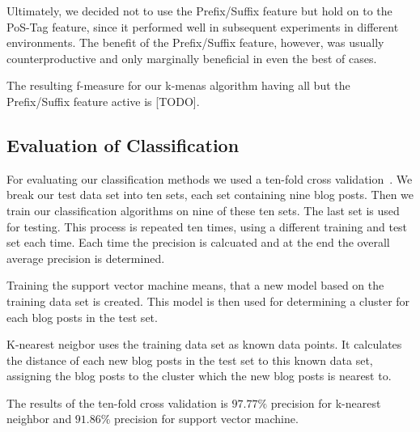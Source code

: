 Ultimately, we decided not to use the Prefix/Suffix feature but hold on to the PoS-Tag feature, since it performed well in subsequent experiments in different environments.
The benefit of the Prefix/Suffix feature, however, was usually counterproductive and only marginally beneficial in even the best of cases.


The resulting f-measure for our k-menas algorithm having all but the Prefix/Suffix feature active is [TODO].


\subsection{Evaluation of Classification}
For evaluating our classification methods we used a ten-fold cross validation~\cite{kohavi1995study}.
We break our test data set into ten sets, each set containing nine blog posts.
Then we train our classification algorithms on nine of these ten sets.
The last set is used for testing.
This process is repeated ten times, using a different training and test set each time.
Each time the precision is calcuated and at the end the overall average precision is determined.


Training the support vector machine means, that a new model based on the training data set is created.
This model is then used for determining a cluster for each blog posts in the test set.


K-nearest neigbor uses the training data set as known data points.
It calculates the distance of each new blog posts in the test set to this known data set, assigning the blog posts to the cluster which the new blog posts is nearest to.


The results of the ten-fold cross validation is $97.77\%$ precision for k-nearest neighbor and $91.86\%$ precision for support vector machine.
